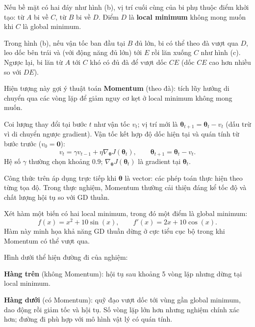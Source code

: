\begin{luuy}[title={Hai đáy thung lũng và local minimum}]
Nếu bề mặt có hai đáy như hình (b), vị trí cuối cùng của bi phụ thuộc điểm khởi tạo: từ $A$ bi về $C$, từ $B$ bi về $D$. Điểm $D$ là \textbf{local minimum} không mong muốn khi $C$ là global minimum.
\end{luuy}

\begin{dongco}[title={Động lượng giúp vượt đáy cục bộ}]
Trong hình (b), nếu vận tốc ban đầu tại $B$ đủ lớn, bi có thể theo đà vượt qua $D$, leo dốc bên trái và (với động năng đủ lớn) tới $E$ rồi lăn xuống $C$ như hình (c). Ngược lại, bi lăn từ $A$ tới $C$ khó có đủ đà để vượt dốc $CE$ (dốc $CE$ cao hơn nhiều so với $DE$).

Hiện tượng này gợi ý thuật toán \textbf{Momentum} (theo đà): tích lũy hướng di chuyển qua các vòng lặp để giảm nguy cơ kẹt ở local minimum không mong muốn.
\end{dongco}

\begin{congthuc}[title={Cập nhật Gradient Descent với Momentum}]
Coi lượng thay đổi tại bước $t$ như vận tốc $v_t$; vị trí mới là $\boldsymbol{\theta}_{t+1} = \boldsymbol{\theta}_{t} - v_t$ (dấu trừ vì di chuyển ngược gradient). Vận tốc kết hợp độ dốc hiện tại và quán tính từ bước trước ($v_0 = \mathbf{0}$):
\[
 v_{t}= \gamma v_{t-1} + \eta \nabla_{\boldsymbol{\theta}}J(\boldsymbol{\theta}_t),
 \qquad
 \boldsymbol{\theta}_{t+1} = \boldsymbol{\theta}_t - v_t.
\]
Hệ số $\gamma$ thường chọn khoảng $0.9$; $\nabla_{\boldsymbol{\theta}}J(\boldsymbol{\theta}_t)$ là gradient tại $\boldsymbol{\theta}_t$.
\end{congthuc}

\begin{luuy}[title={Không gian nhiều chiều}]
Công thức trên áp dụng trực tiếp khi $\boldsymbol{\theta}$ là vector: các phép toán thực hiện theo từng tọa độ. Trong thực nghiệm, Momentum thường cải thiện đáng kể tốc độ và chất lượng hội tụ so với GD thuần.
\end{luuy}

\begin{vidu}[title={Hàm $f(x) = x^2 + 10\sin(x)$}]
Xét hàm một biến có hai local minimum, trong đó một điểm là global minimum:
\[
 f(x) = x^2 + 10\sin(x), \qquad f'(x) = 2x + 10\cos(x).
\]
Hàm này minh họa khả năng GD thuần dừng ở cực tiểu cục bộ trong khi Momentum có thể vượt qua.
\end{vidu}

\begin{vidu}[title={So sánh GD và GD với Momentum}]
Hình dưới thể hiện đường đi của nghiệm:


\textbf{Hàng trên} (không Momentum): hội tụ sau khoảng 5 vòng lặp nhưng dừng tại local minimum.

\textbf{Hàng dưới} (có Momentum): quỹ đạo vượt dốc tới vùng gần global minimum, dao động rồi giảm tốc và hội tụ. Số vòng lặp lớn hơn nhưng nghiệm chính xác hơn; đường đi phù hợp với mô hình vật lý có quán tính.
\end{vidu}


